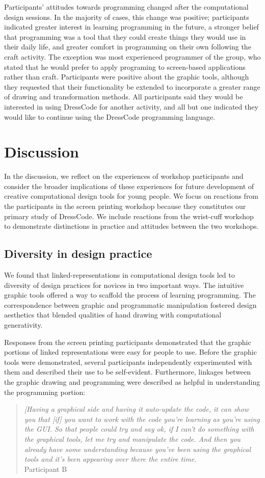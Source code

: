\documentclass{sigchi}
\begin{document}
Participants' attitudes towards programming changed after the computational design sessions. In the majority of cases, this change was positive; participants indicated greater interest in learning programming in the future, a stronger belief that programming was a tool that they could create things they would use in their daily life, and greater comfort in programming on their own following the craft activity. The exception was most experienced programmer of the group, who stated that he would prefer to apply programing to screen-based applications rather than craft. Participants were positive about the graphic tools, although they requested that their functionality be extended to incorporate a greater range of drawing and transformation methods. All participants said they would be interested in using DressCode for another activity, and all but one indicated they would like to continue using the DressCode programming language.

\section{Discussion}
In the discussion, we reflect on the experiences of workshop participants and consider the broader implications of these experiences for future development of creative computational design tools for young people. We focus on reactions from the participants in the screen printing workshop because they constitutes our primary study of DressCode. We include reactions from the wrist-cuff workshop to demonstrate distinctions in practice and attitudes between the two workshops.

\subsection{Diversity in design practice}
We found that linked-representations in computational design tools led to diversity of design practices for novices in two important ways. The intuitive graphic tools offered a way to scaffold the process of learning programming. The correspondence between graphic and programmatic manipulation fostered design aesthetics that blended qualities of hand drawing with computational generativity.

Responses from the screen printing participants demonstrated that the graphic portions of linked representations were easy for people to use. Before the graphic tools were demonstrated, several participants independently experimented with them and described their use to be self-evident. Furthermore, linkages between the graphic drawing and programming were described as helpful in understanding the programming portion:
\begin{quote}
\textit{[Having a graphical side and having it auto-update the code, it can show you that [if] you want to work with the code you're learning as you're using the GUI. So that people could try and say ok, if I can't do something with the graphical tools, let me try and manipulate the code. And then you already have some understanding because you've been using the graphical tools and it's been appearing over there the entire time.}
\\Participant B
\end{quote} 
\end{document}

